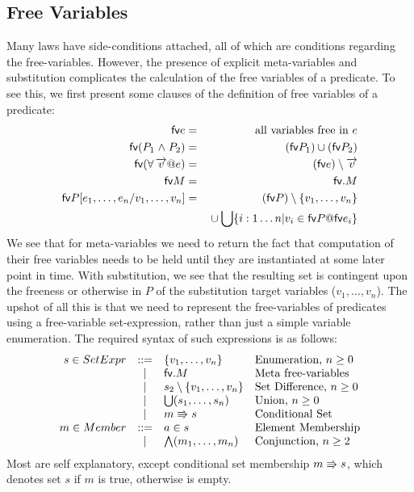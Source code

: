 \subsection{Free Variables}
\label{ssec:free-vars}

Many laws have side-conditions attached,
all of which are conditions regarding the free-variables.
However, the presence of explicit meta-variables and substitution
 complicates the calculation of the free variables of a predicate.
To see this, we first present some clauses of the definition of free variables
of a predicate:
  \begin{eqnarray*}
     \fv e &=& \mbox{all variables free in }e
  \\ \fv (P_1 \land P_2) &=& (\fv P_1) \cup (\fv P_2)
  \\ \fv (\forall \lst v @ e) &=& (\fv e) \setminus \lst v
  \\ \fv M &=& \fv.M
  \\ \fv P[e_1,\ldots,e_n/v_1,\ldots,v_n]
     &=& (\fv P)\setminus\setof{v_1,\ldots,v_n}
  \\ && {} \union
         \bigcup \setof{ i : 1 \ldots n | v_i \in \fv P @ \fv e_i }
  \end{eqnarray*}
We see that for meta-variables we need to return the fact that computation
of their free variables needs to be held until
they are instantiated at some later point in time.
With substitution, we see that the resulting set is contingent
upon the freeness or otherwise in $P$
of the substitution target variables ($v_1,\ldots,v_n$).
The upshot of all this is that we need to represent the free-variables
of predicates using a free-variable set-expression, rather than
just a simple variable enumeration.
The required syntax of such expressions is as follows:
  $$\begin{array}{rcll}
     s \in SetExpr & ::= & \{ v_1, \ldots, v_n\} & \mbox{Enumeration, }n \geq 0
  \\               &  |  & \mathsf{fv}.M & \mbox{Meta free-variables}
  \\               &  |  & s_2 \setminus \{ v_1, \ldots , v_n\}
                        & \mbox{Set Difference, } n \geq 0
  \\               &  |  & \bigcup (s_1,\ldots,s_n) & \mbox{Union, }n \geq 0
  \\               &  |  & m \Rrightarrow s & \mbox{Conditional Set}
  \\ m \in Member  & ::= & a \in s & \mbox{Element Membership}
  \\              &  |  & \bigwedge (m_1,\ldots,m_n) & \mbox{Conjunction, }n \geq 2
  \end{array}$$
Most are self explanatory, except conditional set membership
$m \Rrightarrow s$, which denotes set $s$ if $m$ is true, otherwise is empty.

